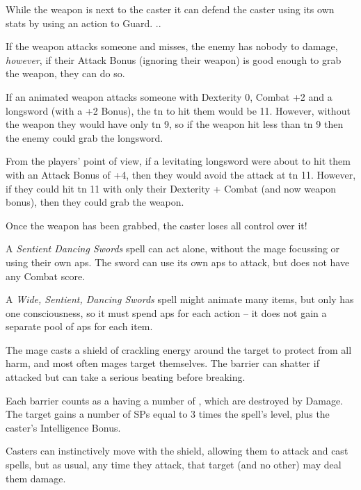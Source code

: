 \begin{multicols}{2}
{While the weapon is next to the caster it can defend the caster using its own stats by using an action to Guard.
}{.}.

If the weapon attacks someone and misses, the enemy has nobody to damage, \emph{however}, if their Attack Bonus (ignoring their weapon) is good enough to grab the weapon, they can do so.

\begin{exampletext}

  If an animated weapon attacks someone with Dexterity 0, Combat +2 and a longsword (with a +2 Bonus), the \gls{tn} to hit them would be 11.
  However, without the weapon they would have only \gls{tn} 9, so if the weapon hit less than \gls{tn} 9 then the enemy could grab the longsword.

  From the players' point of view, if a levitating longsword were about to hit them with an Attack Bonus of +4, then they would avoid the attack at \gls{tn} 11.
  However, if they could hit \gls{tn} 11 with only their Dexterity + Combat (and now weapon bonus), then they could grab the weapon.

\end{exampletext}

Once the weapon has been grabbed, the caster loses all control over it!

A \textit{Sentient Dancing Swords} spell can act alone, without the mage focussing or using their own \glspl{ap}.
The sword can use its own \glspl{ap} to attack, but does not have any Combat score.

A \textit{Wide, Sentient, Dancing Swords} spell might animate many items, but only has one consciousness, so it must spend \glspl{ap} for each action -- it does not gain a separate pool of \glspl{ap} for each item.


The mage casts a shield of crackling energy around the target to protect from all harm, and most often mages target themselves.
The barrier can shatter if attacked but can take a serious beating before breaking.

Each barrier counts as a having a number of , which are destroyed by Damage.
The target gains a number of \glspl{SP} equal to 3 times the spell's level, plus the caster's Intelligence Bonus.

Casters can instinctively move with the shield, allowing them to attack and cast spells, but as usual, any time they attack, that target (and no other) may deal them damage.


\end{multicols}
